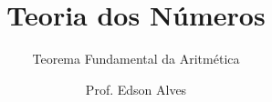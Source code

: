 \title{Teoria dos Números}
\subtitle{Teorema Fundamental da Aritmética}
\author{Prof. Edson Alves}
\date{}
